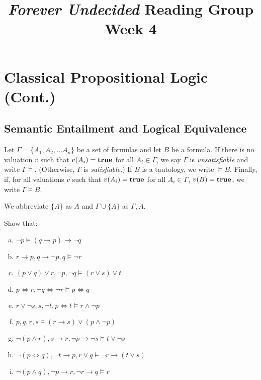 \documentclass{article}
\title{\emph{Forever Undecided} Reading Group \\ Week 4}
\date{}
\author{}
\begin{document}
\maketitle

\section*{Classical Propositional Logic (Cont.)}

\subsection*{Semantic Entailment and Logical Equivalence}

\begin{definition}
    Let $\Gamma = \{A_1, A_2, \dots A_n \}$ be a set of formulas and let $B$ be a formula. If there is no valuation $v$ such that $v(A_i) = \mathbf{true}$ for all $A_i \in \Gamma$, we say $\Gamma$ is \emph{unsatisfiable} and write $\Gamma \models$. (Otherwise, $\Gamma$ is \emph{satisfiable}.) If $B$ is a tautology, we write $\models B$. Finally, if, for all valuations $v$ such that $v(A_i) = \mathbf{true}$ for all $A_i \in \Gamma$, $v(B) = \mathbf{true}$, we write $\Gamma \models B$. 
\end{definition}

\begin{notation} 
    We abbreviate $\{ A \}$ as $A$ and $\Gamma \cup \{ A \}$ as $\Gamma, A$.
\end{notation}

\begin{prob}{4.1}
    Show that:
    \begin{multicols}{2}
    \begin{enumerate}[a)]
    \item $\neg p \models (q \to p) \to \neg q$
    \item ${r \to p}, {q \to \neg p}, q \models \neg r$
    \item $(p \vee q) \vee r, \neg p, \neg q \models (r \vee s) \vee t$
    \item ${p \iff r}, {\neg q \iff \neg r} \models {p \iff q}$
    \item ${r \vee \neg s}, s, \neg t, {p \iff t} \models {r \wedge \neg p}$
    \item $p, q, r, s \models ({r \to s}) \vee ({p \wedge \neg p})$
    \item ${\neg (p \wedge r)}, {s \to r}, {\neg p \to \neg s} \models t \vee {\neg s}$
    \item ${\neg (p \iff q)}, {\neg t \to p}, {r \vee q} \models {\neg r \to (t \vee s)}$
    \item ${\neg (p \wedge q)}, {\neg p \to r}, {\neg r \to q} \models r$
    \end{enumerate}
    \end{multicols}
\end{prob}
\end{document}
